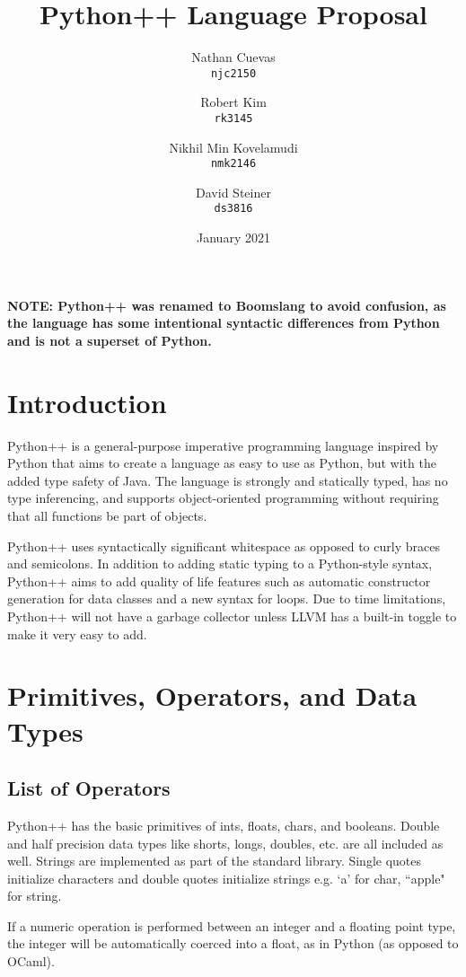 \documentclass{article}
\title{Python++ Language Proposal}
\author{
Nathan Cuevas\\
\texttt{njc2150} 
\and
Robert Kim\\
\texttt{rk3145} \and
Nikhil Min Kovelamudi \\
\texttt{nmk2146} \and
David Steiner \\
\texttt{ds3816}
}
\date{January 2021}
\begin{document}
\maketitle

\textbf{NOTE: Python++ was renamed to Boomslang to avoid confusion, as the language has some intentional syntactic differences from Python and is not a superset of Python.}

\section{Introduction}
Python++ is a general-purpose imperative programming language inspired by Python that aims to create a language as easy to use as Python, but with the added type safety of Java. The language is strongly and statically typed, has no type inferencing, and supports object-oriented programming without requiring that all functions be part of objects.

Python++ uses syntactically significant whitespace as opposed to curly braces and semicolons. In addition to adding static typing to a Python-style syntax, Python++ aims to add quality of life features such as automatic constructor generation for data classes and a new syntax for loops. Due to time limitations, Python++ will not have a garbage collector unless LLVM has a built-in toggle to make it very easy to add.

\section{Primitives, Operators, and Data Types}
\subsection{List of Operators}
Python++ has the basic primitives of ints, floats, chars, and booleans.  Double and half precision data types like shorts, longs, doubles, etc. are all included as well.  Strings are implemented as part of the standard library.  Single quotes initialize characters and double quotes initialize strings e.g. `a' for char, ``apple" for string.  

If a numeric operation is performed between an integer and a floating point type, the integer will be automatically coerced into a float, as in Python (as opposed to OCaml).
\end{document}
